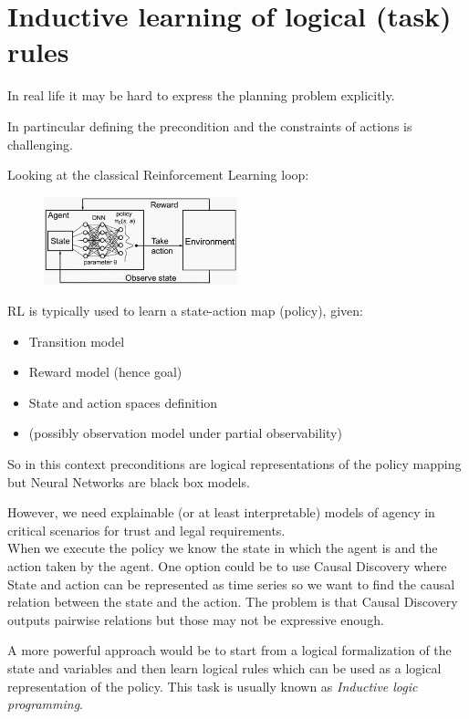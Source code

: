 \section{Inductive learning of logical (task) rules}
In real life it may be hard to express the planning problem explicitly.

In partincular defining the precondition and the constraints of actions is challenging.

Looking at the classical Reinforcement Learning loop:
\begin{figure}[H]
    \includegraphics[width=0.5\textwidth]{img/RL.png}
    \centering
\end{figure}

RL is typically used to learn a state-action map (policy), given:
\begin{itemize}
    \item Transition model
    \item Reward model (hence goal)
    \item State and action spaces definition
    \item (possibly observation model under partial observability)
\end{itemize}

So in this context preconditions are logical representations of the policy mapping 
but Neural Networks are black box models.

However, we need explainable (or at least interpretable) models of agency in critical scenarios for trust and legal requirements.\\

When we execute the policy we know the state in which the agent is and the action taken by the agent.
One option could be to use Causal Discovery where State and action can be represented as time series so we want to find the causal relation between the state and the action.
The problem is that Causal Discovery outputs pairwise relations but those may not be expressive enough.

A more powerful approach would be to start from a logical formalization 
of the state and variables and then learn logical rules which can be used as a logical representation of the policy.
This task is usually known as \emph{Inductive logic programming}.

